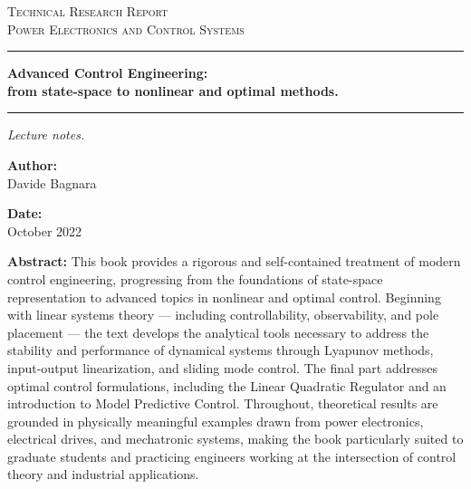 \documentclass[12pt,a4paper,oneside]{book}
\newcommand{\DocCategory}{Technical Research Report}
\newcommand{\DocField}{Power Electronics and Control Systems}
\newcommand{\DocTitle}{%
	{\fontsize{20}{24}\selectfont\bfseries Advanced Control Engineering:} \\[16pt]
	{\fontsize{16}{20}\selectfont\bfseries from state-space to nonlinear and optimal methods.}
}
\newcommand{\DocSubtitle}{%
	Lecture notes.
}
\newcommand{\DocAuthor}{Davide Bagnara}
\newcommand{\DocDate}{October 2022}
\newcommand{\DocAbstract}{%
	This book provides a rigorous and self-contained treatment of modern control engineering, progressing from the foundations of state-space representation to advanced topics in nonlinear and optimal control. Beginning with linear systems theory — including controllability, observability, and pole placement — the text develops the analytical tools necessary to address the stability and performance of dynamical systems through Lyapunov methods, input-output linearization, and sliding mode control. The final part addresses optimal control formulations, including the Linear Quadratic Regulator and an introduction to Model Predictive Control. Throughout, theoretical results are grounded in physically meaningful examples drawn from power electronics, electrical drives, and mechatronic systems, making the book particularly suited to graduate students and practicing engineers working at the intersection of control theory and industrial applications.
}
\begin{document}
	\titlepage
	\begin{center}
		{\Large\scshape \DocCategory}\\[8pt]
		{\large\scshape \DocField}
	\end{center}
	
	\vspace{18pt}
	\noindent\rule{\linewidth}{0.8pt}
	
	\vspace{28pt}
	\begin{center}
		\DocTitle
	\end{center}
	
	\vspace{4pt}
	\noindent\rule{\linewidth}{2.2pt}
	
	\vspace{14pt}
	\begin{center}
		\begin{onehalfspace}
			{\large\itshape \DocSubtitle}
		\end{onehalfspace}
	\end{center}
	
	\vspace{18pt}
	
	\begin{minipage}{0.92\linewidth}
		\noindent
		\begin{minipage}[t]{0.48\linewidth}
			\textbf{Author:}\\[2pt]
			\DocAuthor
		\end{minipage}%
		\hfill
		\begin{minipage}[t]{0.48\linewidth}
			\raggedleft
			\textbf{Date:}\\[2pt]
			\DocDate
		\end{minipage}
	\end{minipage}
	\vspace{18pt}
	
	\begin{center}
		\begin{minipage}{0.85\linewidth}
			\footnotesize 
			\begin{onehalfspace}
				\textbf{Abstract:} \DocAbstract
			\end{onehalfspace}
		\end{minipage}
	\end{center}
	
\end{document}
